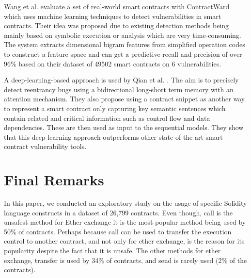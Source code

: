 \documentclass[10pt,conference]{IEEEtran}
\newcommand{\totalContracts}{26,799\xspace}
\begin{document}
Wang et al. \cite{contractward} evaluate a set of real-world smart contracts with ContractWard which uses machine learning techniques to detect vulnerabilities in smart contracts. Their idea was proposed due to existing detection methods being mainly based on symbolic execution or analysis which are very time-consuming. The system extracts dimensional bigram features from simplified operation codes to construct a feature space and can get a predictive recall and precision of over 96\% based on their dataset of 49502 smart contracts on 6 vulnerabilities.

A deep-learning-based approach is used by Qian et al. \cite{automated}. The aim is to precisely detect reentrancy bugs using a bidirectional long-short term memory with an attention mechanism. They also propose using a contract snippet as another way to represent a smart contract only capturing key semantic sentences which contain related and critical information such as control flow and data dependencies. These are then used as input to the sequential models. They show that this deep-learning approach outperforms other state-of-the-art smart contract vulnerability tools.


\section{Final Remarks}

In this paper, we conducted an exploratory study on the usage of specific Solidity language constructs in a dataset of \totalContracts contracts. Even though, call is the unsafest method for Ether exchange it is the most popular method being used by 50\% of contracts. Perhaps because call can be used to transfer the execution control to another contract, and not only for ether exchange, is the reason for its popularity despite the fact that it is unsafe. The other methods for ether exchange, transfer is used by 34\% of contracts, and send is rarely used (2\% of the contracts).
\end{document}
